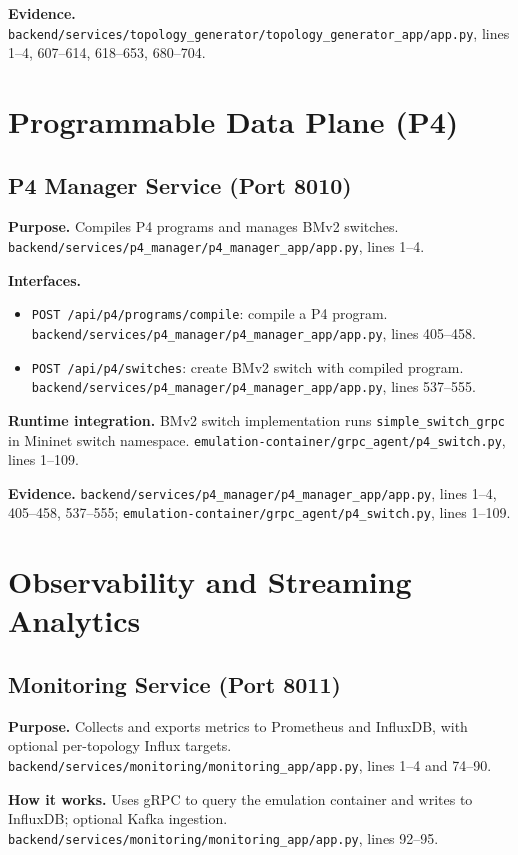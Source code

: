 \documentclass[conference]{IEEEtran}
\begin{document}
\textbf{Evidence.} \texttt{backend/services/topology\_generator/topology\_generator\_app/app.py}, lines 1--4, 607--614, 618--653, 680--704.

\section{Programmable Data Plane (P4)}

\subsection{P4 Manager Service (Port 8010)}
\textbf{Purpose.} Compiles P4 programs and manages BMv2 switches. \texttt{backend/services/p4\_manager/p4\_manager\_app/app.py}, lines 1--4.

\textbf{Interfaces.}
\begin{itemize}
\item \texttt{POST /api/p4/programs/compile}: compile a P4 program. \texttt{backend/services/p4\_manager/p4\_manager\_app/app.py}, lines 405--458.
\item \texttt{POST /api/p4/switches}: create BMv2 switch with compiled program. \texttt{backend/services/p4\_manager/p4\_manager\_app/app.py}, lines 537--555.
\end{itemize}

\textbf{Runtime integration.} BMv2 switch implementation runs \texttt{simple\_switch\_grpc} in Mininet switch namespace. \texttt{emulation-container/grpc\_agent/p4\_switch.py}, lines 1--109.

\textbf{Evidence.} \texttt{backend/services/p4\_manager/p4\_manager\_app/app.py}, lines 1--4, 405--458, 537--555; \texttt{emulation-container/grpc\_agent/p4\_switch.py}, lines 1--109.

\section{Observability and Streaming Analytics}

\subsection{Monitoring Service (Port 8011)}
\textbf{Purpose.} Collects and exports metrics to Prometheus and InfluxDB, with optional per-topology Influx targets. \texttt{backend/services/monitoring/monitoring\_app/app.py}, lines 1--4 and 74--90.

\textbf{How it works.} Uses gRPC to query the emulation container and writes to InfluxDB; optional Kafka ingestion. \texttt{backend/services/monitoring/monitoring\_app/app.py}, lines 92--95.
\end{document}
